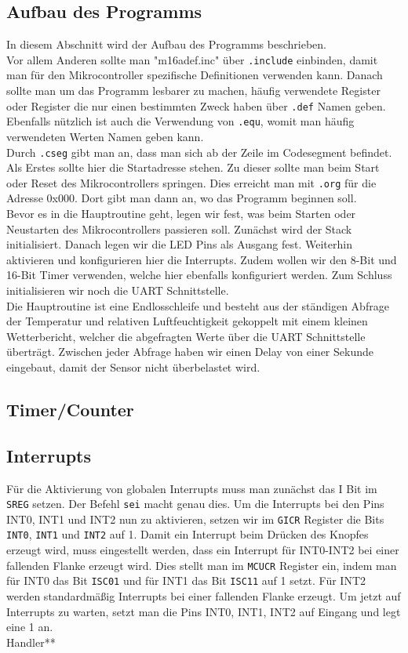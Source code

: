 \documentclass[]{article}
\begin{document}
\subsection{Aufbau des Programms}
In diesem Abschnitt wird der Aufbau des Programms beschrieben.
\\Vor allem Anderen sollte man "m16adef.inc" über \texttt{.include} einbinden, damit man für den Mikrocontroller spezifische Definitionen verwenden kann. Danach sollte man um das Programm lesbarer zu machen, häufig verwendete Register oder Register die nur einen bestimmten Zweck haben über \texttt{.def} Namen geben. Ebenfalls nützlich ist auch die Verwendung von \texttt{.equ}, womit man häufig verwendeten Werten Namen geben kann.
\\Durch \texttt{.cseg} gibt man an, dass man sich ab der Zeile im Codesegment befindet. Als Erstes sollte hier die Startadresse stehen. Zu dieser sollte man beim Start oder Reset des Mikrocontrollers springen. Dies erreicht man mit \texttt{.org} für die Adresse 0x000. Dort gibt man dann an, wo das Programm beginnen soll.
\\Bevor es in die Hauptroutine geht, legen wir fest, was beim Starten oder Neustarten des Mikrocontrollers passieren soll. Zunächst wird der Stack initialisiert. Danach legen wir die LED Pins als Ausgang fest. Weiterhin aktivieren und konfigurieren hier die Interrupts. Zudem wollen wir den 8-Bit und 16-Bit Timer verwenden, welche hier ebenfalls konfiguriert werden. Zum Schluss initialisieren wir noch die UART Schnittstelle.
\\Die Hauptroutine ist eine Endlosschleife und besteht aus der ständigen Abfrage der Temperatur und relativen Luftfeuchtigkeit gekoppelt mit einem kleinen Wetterbericht, welcher die abgefragten Werte über die UART Schnittstelle überträgt. Zwischen jeder Abfrage haben wir einen Delay von einer Sekunde eingebaut, damit der Sensor nicht überbelastet wird.

\subsection{Timer/Counter}

\subsection{Interrupts}
Für die Aktivierung von globalen Interrupts muss man zunächst das I Bit im \texttt{SREG} setzen. Der Befehl \texttt{sei} macht genau dies. Um die Interrupts bei den Pins INT0, INT1 und INT2 nun zu aktivieren, setzen wir im \texttt{GICR} Register die Bits \texttt{INT0}, \texttt{INT1} und \texttt{INT2} auf 1. Damit ein Interrupt beim Drücken des Knopfes erzeugt wird, muss eingestellt werden, dass ein Interrupt für INT0-INT2 bei einer fallenden Flanke erzeugt wird. Dies stellt man im \texttt{MCUCR} Register ein, indem man für INT0 das Bit \texttt{ISC01} und für INT1 das Bit \texttt{ISC11} auf 1 setzt. Für INT2 werden standardmäßig Interrupts bei einer fallenden Flanke erzeugt. Um jetzt auf Interrupts zu warten, setzt man die Pins INT0, INT1, INT2 auf Eingang und legt eine 1 an. 
\\Handler**
\end{document}
